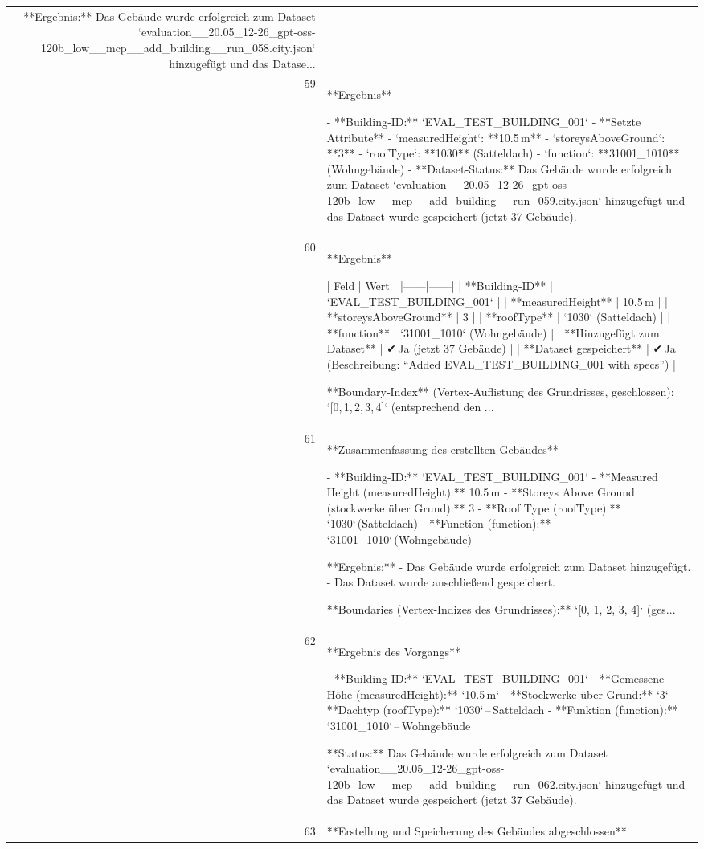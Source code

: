 \documentclass[a4paper,11pt]{article}
\begin{document}
\begin{table}[ht]
\begin{tabular}{r p{12cm}}
**Ergebnis:** Das Gebäude wurde erfolgreich zum Dataset `evaluation\_\_20.05\_12-26\_gpt-oss-120b\_low\_\_mcp\_\_add\_building\_\_run\_058.city.json` hinzugefügt und das Datase... \\
59 & **Ergebnis**

- **Building‑ID:** `EVAL\_TEST\_BUILDING\_001`  
- **Setzte Attribute**  
  - `measuredHeight`: **10.5 m**  
  - `storeysAboveGround`: **3**  
  - `roofType`: **1030** (Satteldach)  
  - `function`: **31001\_1010** (Wohngebäude)  
- **Dataset‑Status:** Das Gebäude wurde erfolgreich zum Dataset `evaluation\_\_20.05\_12-26\_gpt-oss-120b\_low\_\_mcp\_\_add\_building\_\_run\_059.city.json` hinzugefügt und das Dataset wurde gespeichert (jetzt 37 Gebäude). \\
60 & **Ergebnis**

| Feld | Wert |
|------|------|
| **Building‑ID** | `EVAL\_TEST\_BUILDING\_001` |
| **measuredHeight** | 10.5 m |
| **storeysAboveGround** | 3 |
| **roofType** | `1030` (Satteldach) |
| **function** | `31001\_1010` (Wohngebäude) |
| **Hinzugefügt zum Dataset** | ✔ Ja (jetzt 37 Gebäude) |
| **Dataset gespeichert** | ✔ Ja (Beschreibung: “Added EVAL\_TEST\_BUILDING\_001 with specs”) |

**Boundary‑Index** (Vertex‑Auflistung des Grundrisses, geschlossen):  
`[0, 1, 2, 3, 4]` (entsprechend den ... \\
61 & **Zusammenfassung des erstellten Gebäudes**

- **Building-ID:** `EVAL\_TEST\_BUILDING\_001`  
- **Measured Height (measuredHeight):** 10.5 m  
- **Storeys Above Ground (stockwerke über Grund):** 3  
- **Roof Type (roofType):** `1030` (Satteldach)  
- **Function (function):** `31001\_1010` (Wohngebäude)  

**Ergebnis:**  
- Das Gebäude wurde erfolgreich zum Dataset hinzugefügt.  
- Das Dataset wurde anschließend gespeichert.  

**Boundaries (Vertex‑Indizes des Grundrisses):**  
`[0, 1, 2, 3, 4]` (ges... \\
62 & **Ergebnis des Vorgangs**

- **Building-ID:** `EVAL\_TEST\_BUILDING\_001`  
- **Gemessene Höhe (measuredHeight):** `10.5 m`  
- **Stockwerke über Grund:** `3`  
- **Dachtyp (roofType):** `1030` – Satteldach  
- **Funktion (function):** `31001\_1010` – Wohngebäude  

**Status:** Das Gebäude wurde erfolgreich zum Dataset `evaluation\_\_20.05\_12-26\_gpt-oss-120b\_low\_\_mcp\_\_add\_building\_\_run\_062.city.json` hinzugefügt und das Dataset wurde gespeichert (jetzt 37 Gebäude). \\
63 & **Erstellung und Speicherung des Gebäudes abgeschlossen**


\end{tabular}
\end{table}
\end{document}
